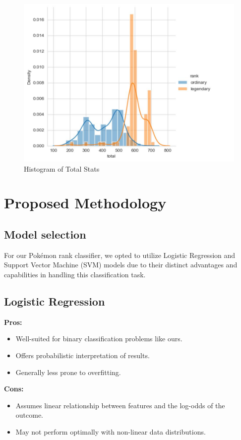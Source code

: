 \documentclass[conference]{IEEEtran}
\begin{document}
\begin{figure}
  \centering
  \includegraphics[width=1\linewidth]{Fig3.jpg}
  \caption{Histogram of Total Stats}
  \label{fig:your_photo}
\end{figure}

\section{Proposed Methodology}
\subsection{Model selection}
For our Pokémon rank classifier, we opted to utilize Logistic Regression and Support Vector Machine (SVM) models due to their distinct advantages and capabilities in handling this classification task.

\subsection{Logistic Regression}
\textbf{Pros:}
\begin{itemize}
    \item Well-suited for binary classification problems like ours.
    \item Offers probabilistic interpretation of results.
    \item Generally less prone to overfitting.
\end{itemize}

\textbf{Cons:}
\begin{itemize}
    \item Assumes linear relationship between features and the log-odds of the outcome.
    \item May not perform optimally with non-linear data distributions.
\end{itemize}
\end{document}
